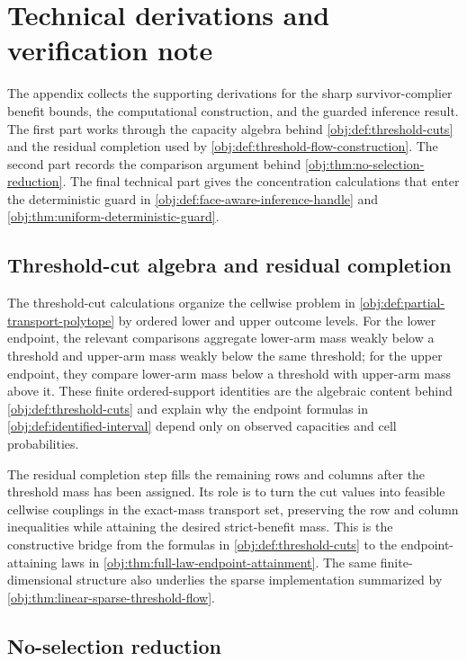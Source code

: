 \section{Technical derivations and verification note}

The appendix collects the supporting derivations for the sharp survivor-complier benefit bounds, the computational construction, and the guarded inference result.  The first part works through the capacity algebra behind \cref{obj:def:threshold-cuts} and the residual completion used by \cref{obj:def:threshold-flow-construction}.  The second part records the comparison argument behind \cref{obj:thm:no-selection-reduction}.  The final technical part gives the concentration calculations that enter the deterministic guard in \cref{obj:def:face-aware-inference-handle} and \cref{obj:thm:uniform-deterministic-guard}.

\subsection{Threshold-cut algebra and residual completion}

The threshold-cut calculations organize the cellwise problem in \cref{obj:def:partial-transport-polytope} by ordered lower and upper outcome levels.  For the lower endpoint, the relevant comparisons aggregate lower-arm mass weakly below a threshold and upper-arm mass weakly below the same threshold; for the upper endpoint, they compare lower-arm mass below a threshold with upper-arm mass above it.  These finite ordered-support identities are the algebraic content behind \cref{obj:def:threshold-cuts} and explain why the endpoint formulas in \cref{obj:def:identified-interval} depend only on observed capacities and cell probabilities.

The residual completion step fills the remaining rows and columns after the threshold mass has been assigned.  Its role is to turn the cut values into feasible cellwise couplings in the exact-mass transport set, preserving the row and column inequalities while attaining the desired strict-benefit mass.  This is the constructive bridge from the formulas in \cref{obj:def:threshold-cuts} to the endpoint-attaining laws in \cref{obj:thm:full-law-endpoint-attainment}.  The same finite-dimensional structure also underlies the sparse implementation summarized by \cref{obj:thm:linear-sparse-threshold-flow}.

\subsection{No-selection reduction}

